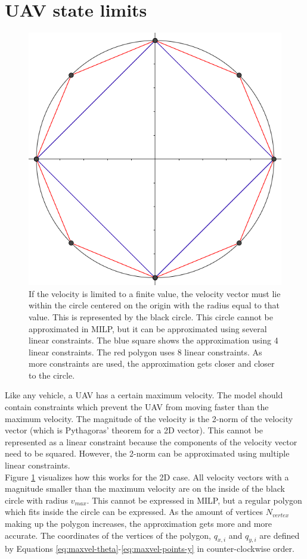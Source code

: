 \section{UAV state limits}
\label{subsec:state-limits}
\begin{figure}
    \centering
        \includegraphics[width=0.5\columnwidth]{img/circlelinear}
    \caption[A visualization of the linear approximation for the 2-norm]{If the velocity is limited to a finite value, the velocity vector must lie within the circle centered on the origin with the radius equal to that value. This is represented by the black circle. This circle cannot be approximated in MILP, but it can be approximated using several linear constraints. The blue square shows the approximation using 4 linear constraints. The red polygon uses 8 linear constraints. As more constraints are used, the approximation gets closer and closer to the circle. }\label{fig:circlelinear}
\end{figure}
Like any vehicle, a UAV has a certain maximum velocity. The model should contain constraints which prevent the UAV from moving faster than the maximum velocity. The magnitude of the velocity is the 2-norm of the velocity vector (which is Pythagoras' theorem for a 2D vector). This cannot be represented as a linear constraint because the components of the velocity vector need to be squared. However, the 2-norm can be approximated using multiple linear constraints. \\
Figure \ref{fig:circlelinear} visualizes how this works for the 2D case. All velocity vectors with a magnitude smaller than the maximum velocity are on the inside of the black circle with radius $v_{max}$. This cannot be expressed in MILP, but a regular polygon which fits inside the circle can be expressed. As the amount of vertices $N_{vertex}$ making up the polygon increases, the approximation gets more and more accurate. The coordinates of the vertices of the polygon, $q_{x,i}$ and $q_{y,i}$ are defined by Equations \ref{eq:maxvel-theta}-\ref{eq:maxvel-points-y} in counter-clockwise order.

